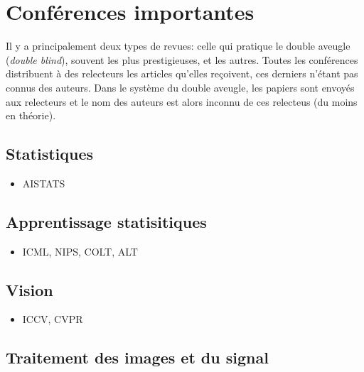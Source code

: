 \section{Conférences importantes}
Il y a principalement deux types de revues: celle qui pratique le double aveugle (\textit{double blind}),
souvent les plus prestigieuses, et les autres. 
Toutes les conférences distribuent à des relecteurs 
les articles qu'elles reçoivent, ces derniers  n'étant pas connus des auteurs. 
Dans le système du double aveugle, les papiers sont envoyés aux
relecteurs et le nom des auteurs est alors inconnu de ces relecteus (du moins en théorie).



\subsection{Statistiques}

\begin{itemize}
 \item AISTATS
\end{itemize}

\subsection{Apprentissage statisitiques}
\begin{itemize}
 \item ICML, NIPS, COLT, ALT
\end{itemize}
\subsection{Vision}

\begin{itemize}
 \item ICCV, CVPR 
\end{itemize}


\subsection{Traitement des images et du signal}

